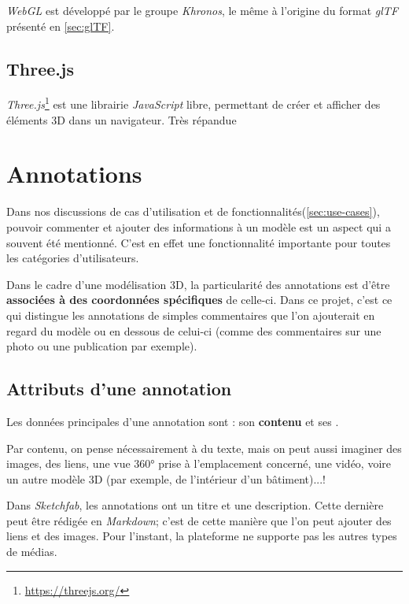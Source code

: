 \textit{WebGL} est développé par le groupe \textit{Khronos}, le même à l'origine du format \textit{glTF} présenté en \ref{sec:glTF}.


\subsection{Three.js}
\textit{Three.js}\footnote{\url{https://threejs.org/}} est une librairie \textit{JavaScript} libre, permettant de créer et afficher des éléments 3D dans un navigateur. Très répandue




\section{Annotations}

Dans nos discussions de cas d'utilisation et de fonctionnalités(\ref{sec:use-cases}), pouvoir commenter et ajouter des informations à un modèle est un aspect qui a souvent été mentionné. C'est en effet une fonctionnalité importante pour toutes les catégories d'utilisateurs.

Dans le cadre d'une modélisation 3D, la particularité des annotations est d'être \textbf{associées à des coordonnées spécifiques} de celle-ci. Dans ce projet, c'est ce qui distingue les annotations de simples commentaires que l'on ajouterait en regard du modèle ou en dessous de celui-ci (comme des commentaires sur une photo ou une publication par exemple).

\subsection{Attributs d'une annotation}
Les données principales d'une annotation sont : son \textbf{contenu} et ses .

Par contenu, on pense nécessairement à du texte, mais on peut aussi imaginer des images, des liens, une vue 360° prise à l'emplacement concerné, une vidéo, voire un autre modèle 3D (par exemple, de l'intérieur d'un bâtiment)...!

Dans \textit{Sketchfab}, les annotations ont un titre et une description. Cette dernière peut être rédigée en \textit{Markdown}; c'est de cette manière que l'on peut ajouter des liens et des images. Pour l'instant, la plateforme ne supporte pas les autres types de médias.


